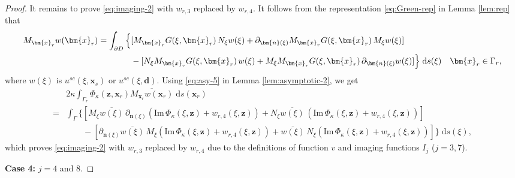 \documentclass[10pt,a4paper]{article}
\numberwithin{equation}{section}
\begin{document}
\begin{proof}
  It remains to prove   \eqref{eq:imaging-2}  with $w_{r,3}$ replaced by $w_{r,4}$.
  It follows from the representation \eqref{eq:Green-rep} in Lemma \ref{lem:rep} that
      \begin{align*}
M_{\bm{x}_r} w(\bm{x}_r) = 
\int_{\partial D}\Big\{ &[M_{\bm{x}_r}G(\xi,\bm{x}_r)\, N_{\xi} w(\xi )
                + \partial_{\bm{n} (\xi)} M_{\bm{ x }_r} G(\xi,\bm{x}_r)\, M_{\xi} w(\xi )  ]\\
&-[N_{\xi}M_{\bm{x}_r}G(\xi,\bm{x}_r)\, w(\xi )
+ M_{\xi}M_{\bm{x}_r}G(\xi,\bm{x}_r)\, \partial_{\bm{n}(\xi)} w(\xi ) ] 
  \Big\} {\;\rm d}s(\xi) \quad \bm{x}_r\in\Gamma_r,
  \end{align*}
  where $w(\xi)$ is $ u^{sc}(\xi,\bm{x}_s)$  or $u^{sc}(\xi,\bm{d})$.
  Using \eqref{eq:asy-5} in Lemma \ref{lem:asymptotic-2}, we get
      \begin{align*}
   & 2 \kappa \int_{ \Gamma_{r} } \Phi_{\kappa}(\bm{ z },\bm{ x }_r) \overline{ M_{\bm{x}_r}w(\bm{ x }_{r})} \;\mathrm{d}s(\bm{ x }_r) \\
        = &  \int_{ \Gamma } \Big\{ [M_{\xi}\overline{w(\xi)} \,
            \partial_{\bm{n}(\xi )}
        (\mathrm{Im}\, \Phi_{\kappa}(\xi,\bm{z}) + w_{r,4}(\xi,\bm{z}) )
        +N_{\xi } \overline{w(\xi)} \,
         (\mathrm{Im}\, \Phi_{\kappa}(\xi,\bm{z}) + w_{r,4}(\xi,\bm{z}) ) ]  \\
   & \qquad - [ \partial_{\bm{n}(\xi )}\overline{w(\xi)}\,
     M_{\xi }
     ( \mathrm{Im}\, \Phi_{\kappa}(\xi,\bm{z}) + w_{r,4}(\xi,\bm{z})  )
     + \overline{w(\xi)}\,  N_{\xi }
     ( \mathrm{Im}\, \Phi_{\kappa}(\xi,\bm{z}) + w_{r,4}(\xi,\bm{z}) )
     ]  \Big\} \;\mathrm{d}s(\xi), 
  \end{align*}
which proves  \eqref{eq:imaging-2}  with $w_{r,3}$ replaced by $w_{r,4}$   due to  the definitions of  function $v$ and imaging functions $I_j$ ($j=3,7$).

 \textbf{Case 4:} $j=4$ and $8$. 


\end{proof}
\end{document}
